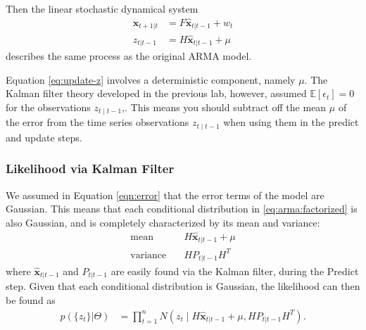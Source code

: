 Then the linear stochastic
dynamical system
\begin{align}
    \hat{\textbf{x}}_{t+1|t} &= F\hat{\textbf{x}}_{t|t-1} + w_t\\
    z_{t|t-1} &= H\hat{\textbf{x}}_{t|t-1} + \mu
    \label{eq:update-z}
\end{align}
describes the same process as the original $\text{ARMA}$ model.

\begin{info}
Equation \ref{eq:update-z} involves a deterministic component, namely $\mu$.
The Kalman filter theory developed in the previous lab, however, assumed $\mathbb{E}[\epsilon_t]=0$ for the observations $z_{t\mid t-1}$,.
This means you should subtract off the mean
$\mu$ of the error from the time series observations $z_{t\mid t-1}$ when using them in the predict and update
steps.
\end{info}

\subsubsection*{Likelihood via Kalman Filter}

We assumed in Equation \ref{eqn:error} that the error terms of the model are Gaussian.
This means that each conditional distribution in \ref{eq:arma:factorized} is also Gaussian, and is completely characterized by its mean and variance:
\begin{align}
    \label{eq:mean:variance1}
    \text{mean} & \quad H\hat{\textbf{x}}_{t|t-1} + \mu \\
    \label{eq:mean:variance2}
    \text{variance} & \quad HP_{t|t-1}H^T
\end{align}
where $\hat{\textbf{x}}_{t|t-1}$ and $P_{t|t-1}$ are easily found via the Kalman filter, during the Predict step.
Given that each conditional distribution is Gaussian, the likelihood can then be found as
\begin{align}
    \label{eq:arma:likelihood}
    p(\{z_t\} | \Theta)& = \prod_{t=1}^{n} N(z_t\mid H\hat{\textbf{x}}_{t|t-1} + \mu, HP_{t|t-1}H^T).
\end{align}

